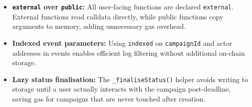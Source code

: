 \begin{itemize}[leftmargin=1.5em]
    \item \textbf{\texttt{external} over \texttt{public}:} All user-facing functions are declared \texttt{external}. External functions read calldata directly, while public functions copy arguments to memory, adding unnecessary gas overhead.
    \item \textbf{Indexed event parameters:} Using \texttt{indexed} on \texttt{campaignId} and actor addresses in events enables efficient log filtering without additional on-chain storage.
    \item \textbf{Lazy status finalisation:} The \texttt{\_finaliseStatus()} helper avoids writing to storage until a user actually interacts with the campaign post-deadline, saving gas for campaigns that are never touched after creation.
\end{itemize}

